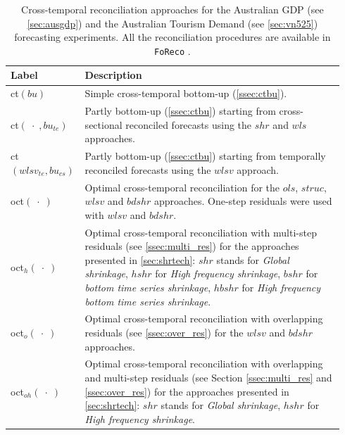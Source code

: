 \documentclass[review, 11pt]{elsarticle}
\theoremstyle{definition}
\newcommand{\tabletag}[1]{%
  \addtocounter{table}{-1}%
  \renewcommand{\thetable}{#1}%
}
\begin{document}
\begin{table}[!t]
	\centering
	\begin{tabular}{M{0.17\linewidth}|L{0.77\linewidth}}
		\toprule
		\textbf{Label} & \textbf{Description} \\
		\midrule
		ct$(bu)$ & Simple cross-temporal bottom-up (\autoref{ssec:ctbu}). \\
		\addlinespace[0.15cm]
		ct$(\;\cdot\;, bu_{te})$ & Partly bottom-up (\autoref{ssec:ctbu}) starting from cross-sectional reconciled forecasts using the $shr$ and $wls$ approaches.\\
		\addlinespace[0.15cm]
		ct$(wlsv_{te}, bu_{cs})$ & Partly bottom-up (\autoref{ssec:ctbu}) starting from temporally reconciled forecasts using the $wlsv$ approach.\\
		\addlinespace[0.15cm]
		oct$(\;\cdot\;)$ & Optimal cross-temporal reconciliation for the $ols$, $struc$, $wlsv$ and $bdshr$ approaches. One-step residuals were used with $wlsv$ and $bdshr$. \\
		\addlinespace[0.15cm]
		oct$_h(\;\cdot\;)$ & Optimal cross-temporal reconciliation with multi-step residuals (see \autoref{ssec:multi_res}) for the approaches presented in \autoref{sec:shrtech}: $shr$ stands for \textit{Global shrinkage}, $hshr$ for \textit{High frequency shrinkage}, $bshr$ for \textit{bottom time series shrinkage}, $hbshr$ for \textit{High frequency bottom time series shrinkage}.\\
		\addlinespace[0.15cm]
		oct$_o(\;\cdot\;)$ & Optimal cross-temporal reconciliation with overlapping residuals (see \autoref{ssec:over_res}) for the $wlsv$ and $bdshr$ approaches. \\
		\addlinespace[0.15cm]
		oct$_{oh}(\;\cdot\;)$ & Optimal cross-temporal reconciliation with overlapping and multi-step residuals (see Section \ref{ssec:multi_res} and \ref{ssec:over_res}) for the approaches presented in \autoref{sec:shrtech}: $shr$ stands for \textit{Global shrinkage}, $hshr$ for \textit{High frequency shrinkage}.\\
		\bottomrule
	\end{tabular}%
	\tabletag{2-old}
	\caption{\color{red}Cross-temporal reconciliation approaches for %
	the Australian GDP (see \autoref{sec:ausgdp}) and the Australian Tourism Demand (see \autoref{sec:vn525}) forecasting experiments. All the reconciliation procedures are available in \texttt{FoReco} \citep{foreco2023}.}
	\label{tab:notation-old}
	\vspace*{-0.5\baselineskip}
\end{table}
\end{document}
